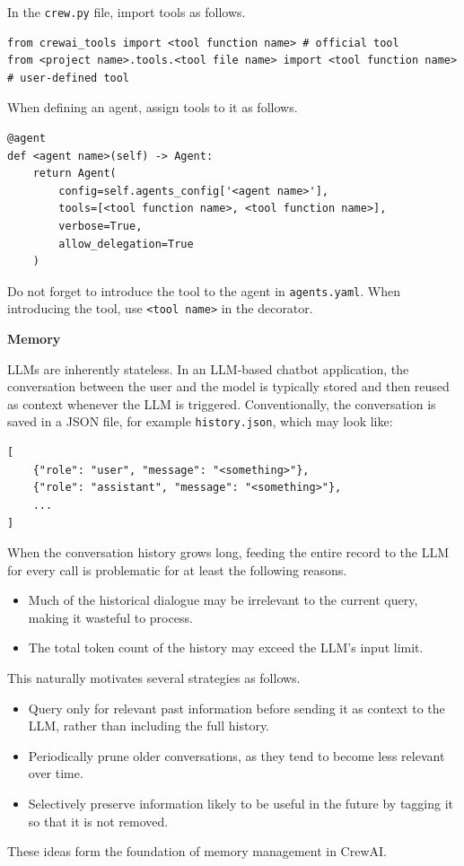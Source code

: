 In the \verb|crew.py| file, import tools as follows.
\begin{lstlisting}
from crewai_tools import <tool function name> # official tool 
from <project name>.tools.<tool file name> import <tool function name> # user-defined tool
\end{lstlisting}
When defining an agent, assign tools to it as follows.
\begin{lstlisting}
@agent
def <agent name>(self) -> Agent:
    return Agent(
        config=self.agents_config['<agent name>'],
        tools=[<tool function name>, <tool function name>],
        verbose=True,
        allow_delegation=True
    )
\end{lstlisting}

Do not forget to introduce the tool to the agent in \verb|agents.yaml|. When introducing the tool, use \texttt{<tool name>} in the decorator.

\vspace{0.1in}
\noindent \textbf{Memory}
\vspace{0.1in}

LLMs are inherently stateless. In an LLM-based chatbot application, the conversation between the user and the model is typically stored and then reused as context whenever the LLM is triggered. Conventionally, the conversation is saved in a JSON file, for example \verb|history.json|, which may look like:
\begin{lstlisting}
[
	{"role": "user", "message": "<something>"},
	{"role": "assistant", "message": "<something>"},
	...
]
\end{lstlisting}

When the conversation history grows long, feeding the entire record to the LLM for every call is problematic for at least the following reasons.
\begin{itemize}
	\item Much of the historical dialogue may be irrelevant to the current query, making it wasteful to process.
	\item The total token count of the history may exceed the LLM’s input limit.
\end{itemize}
This naturally motivates several strategies as follows.
\begin{itemize}
	\item Query only for relevant past information before sending it as context to the LLM, rather than including the full history.
	\item Periodically prune older conversations, as they tend to become less relevant over time.
	\item Selectively preserve information likely to be useful in the future by tagging it so that it is not removed.
\end{itemize}
These ideas form the foundation of memory management in CrewAI.

